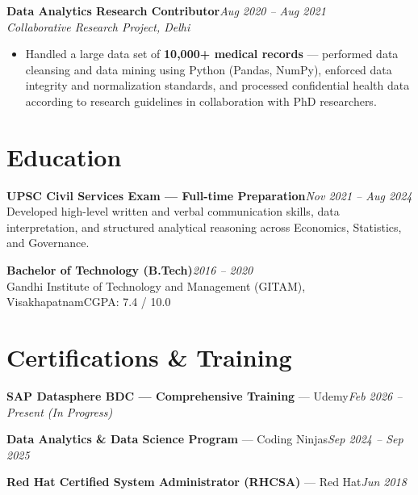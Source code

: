 \documentclass[10pt, letterpaper]{article}
\newcommand{\role}[3]{%
  \vspace{2pt}%
  {\bfseries #1}\hfill{\small\color{muted}\textit{#3}}\\[-2pt]%
  {\small\color{muted}\textit{#2}}%
}
\begin{document}
\role{Data Analytics Research Contributor}{Collaborative Research Project, Delhi}{Aug 2020 – Aug 2021}

\begin{itemize}
  \item Handled a large data set of \textbf{10,000+ medical records} — performed data cleansing and data mining using Python (Pandas, NumPy), enforced data integrity and normalization standards, and processed confidential health data according to research guidelines in collaboration with PhD researchers.
\end{itemize}


\section{Education}

{\bfseries UPSC Civil Services Exam — Full-time Preparation}\hfill{\small\color{muted}\textit{Nov 2021 – Aug 2024}}\\
{\small\color{muted}Developed high-level written and verbal communication skills, data interpretation, and structured analytical reasoning across Economics, Statistics, and Governance.}

\vspace{2pt}
{\bfseries Bachelor of Technology (B.Tech)}\hfill{\small\color{muted}\textit{2016 – 2020}}\\
{\small\color{muted}Gandhi Institute of Technology and Management (GITAM), Visakhapatnam\hfill CGPA: 7.4 / 10.0}

\section{Certifications \& Training}

{\bfseries SAP Datasphere BDC — Comprehensive Training} — Udemy\hfill{\small\color{muted}\textit{Feb 2026 – Present \emph{(In Progress)}}}

\vspace{1pt}
{\bfseries Data Analytics \& Data Science Program} — Coding Ninjas\hfill{\small\color{muted}\textit{Sep 2024 – Sep 2025}}

\vspace{1pt}
{\bfseries Red Hat Certified System Administrator (RHCSA)} — Red Hat\hfill{\small\color{muted}\textit{Jun 2018}}

\end{document}
